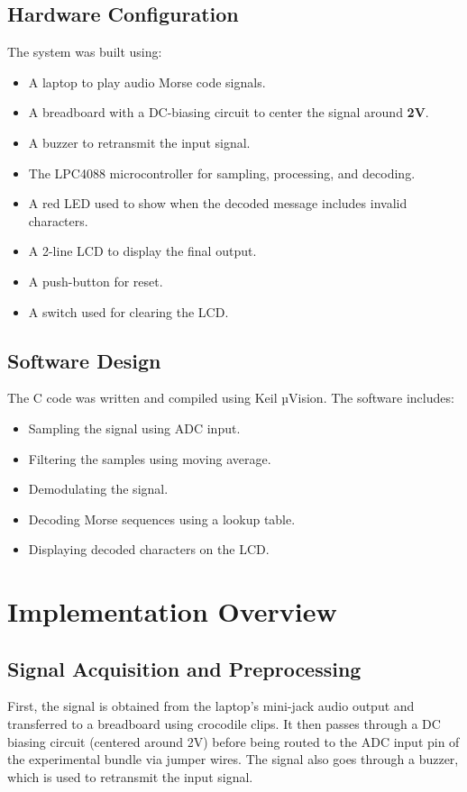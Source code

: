 \documentclass{article}
\begin{document}
\subsection{Hardware Configuration}
The system was built using:
\begin{itemize}
    \item A laptop to play audio Morse code signals.
    \item A breadboard with a DC-biasing circuit to center the signal around \textbf{2V}.
    \item A buzzer to retransmit the input signal.
    \item The LPC4088 microcontroller for sampling, processing, and decoding.
    \item A red LED used to show when the decoded message includes invalid characters.
    \item A 2-line LCD to display the final output.
    \item A push-button for reset.
    \item A switch used for clearing the LCD. 
\end{itemize}

\subsection{Software Design}
The C code was written and compiled using Keil µVision. The software includes:
\begin{itemize}
    \item Sampling the signal using ADC input.
    \item Filtering the samples using moving average.
    \item Demodulating the signal.
    \item Decoding Morse sequences using a lookup table.
    \item Displaying decoded characters on the LCD.
\end{itemize}


\section{Implementation Overview}

\subsection{Signal Acquisition and Preprocessing}
First, the signal is obtained from the laptop's mini-jack audio output and transferred to a breadboard 
using crocodile clips. It then passes through a DC biasing circuit (centered around 2V) 
before being routed to the ADC input pin of the experimental bundle via jumper wires.
The signal also goes through a buzzer, which is used to retransmit the input signal.
\end{document}
